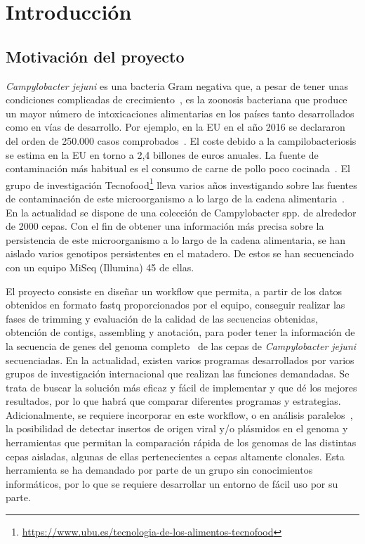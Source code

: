 \chapter{Introducción} 
\label{chap:intro}

\vspace{-0.2cm}

\section{Motivación del proyecto}

\textit{Campylobacter jejuni} es una bacteria Gram negativa que, a pesar de tener unas condiciones complicadas de crecimiento~\cite{garciasanchez2017}, es la zoonosis bacteriana que produce un mayor número de intoxicaciones alimentarias en los países tanto desarrollados como en vías de desarrollo. Por ejemplo, en la EU en el año 2016 se declararon del orden de 250.000 casos comprobados~\cite{report2016}. El coste debido a la campilobacteriosis se estima en la EU en torno a 2,4 billones de euros anuales. La fuente de contaminación más habitual es el consumo de carne de pollo poco cocinada~\cite{GarciaSanchez2018}. El grupo de investigación Tecnofood\footnote{\url{https://www.ubu.es/tecnologia-de-los-alimentos-tecnofood}} lleva varios años investigando sobre las fuentes de contaminación de este microorganismo a lo largo de la cadena alimentaria~\cite{garciasanchez2017, GarciaSanchez2018, Melero2012}. En la actualidad se dispone de una colección de Campylobacter spp. de alrededor de 2000 cepas. Con el fin de obtener una información más precisa sobre la persistencia de este microorganismo a lo largo de la cadena alimentaria, se han aislado varios genotipos persistentes en el matadero. De estos se han secuenciado con un equipo MiSeq (Illumina) 45 de ellas.

El proyecto consiste en diseñar un workflow que permita, a partir de los datos obtenidos en formato fastq proporcionados por el equipo, conseguir realizar las fases de trimming y evaluación de la calidad de las secuencias obtenidas, obtención de contigs, assembling y anotación, para poder tener la información de la secuencia de genes del genoma completo~\cite{Clark2016, Llarena2017, Zhao2016} de las cepas de \textit{Campylobacter jejuni} secuenciadas. En la actualidad, existen varios programas desarrollados por varios grupos de investigación internacional que realizan las funciones demandadas. Se trata de buscar la solución más eficaz y fácil de implementar y que dé los mejores resultados, por lo que habrá que comparar diferentes programas y estrategias. Adicionalmente, se requiere incorporar en este workflow, o en análisis paralelos~\cite{Skarp2015}, la posibilidad de detectar insertos de origen viral y/o plásmidos en el genoma y herramientas que permitan la comparación rápida de los genomas de las distintas cepas aisladas, algunas de ellas pertenecientes a cepas altamente clonales. Esta herramienta se ha demandado por parte de un grupo sin conocimientos informáticos, por lo que se requiere desarrollar un entorno de fácil uso por su parte.

